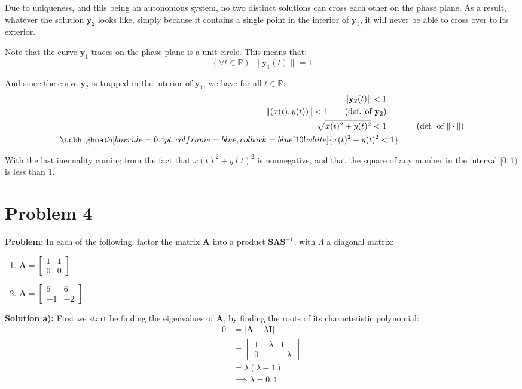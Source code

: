 \documentclass{article}
\begin{document}
Due to uniqueness, and this being an autonomous system, no two distinct solutions can cross each other on the phase plane. As a result, whatever the solution $\mathbf{y}_2$ looks like, simply because it contains a single point in the interior of $\mathbf{y}_1$, it will never be able to cross over to its exterior.

Note that the curve $\mathbf{y}_1$ traces on the phase plane is a unit circle. This means that:
\begin{equation*}
    (\forall t\in\mathbb R)\,\,\|\mathbf{y}_1(t)\|=1
\end{equation*} 

And since the curve $\mathbf{y}_2$ is trapped in the interior of $\mathbf{y}_1$, we have for all $t\in\mathbb R$:
\begin{align*}
    \|\mathbf{y}_2(t)\|<1\phantom{aaa}&\\
    \|(x(t),y(t))\|<1\tag{def. of $\mathbf{y}_2$}\phantom{aaa}&\\
    \sqrt{x(t)^2+y(t)^2}<1\phantom{aaa}&\tag{def. of $\|\cdot\|$}\\
    \tcbhighmath[boxrule=0.4pt,colframe=blue,colback=blue!10!white]{x(t)^2+y(t)^2<1}\phantom{\,}&
\end{align*}

With the last inequality coming from the fact that $x(t)^2+y(t)^2$ is nonnegative, and that the square of any number in the interval $[0,1)$ is less than 1.
    
\section*{Problem 4}
\noindent\textbf{Problem:}  In each of the following, factor the matrix $\mathbf{A}$ into a product $\mathbf{S\Lambda S^{-1}}$, with $\Lambda$ a diagonal matrix:
\begin{enumerate}[label=\textbf{\alph*)}]
    \item $\mathbf{A}=\begin{bmatrix}1&1\\0&0\end{bmatrix}$
    \item $\mathbf{A}=\begin{bmatrix}5&6\\-1&-2\end{bmatrix}$
\end{enumerate}

\bigskip

\noindent\textbf{Solution a):} First we start be finding the eigenvalues of $\mathbf{A}$, by finding the roots of its characteristic polynomial:
\begin{align*}
    0&=|\mathbf{A}-\lambda \mathbf{I}|\\
    &=\begin{vmatrix} 1-\lambda & 1 \\ 0 & -\lambda \end{vmatrix}\\
    &=\lambda(\lambda-1)\\
    &\implies \lambda=0,1
\end{align*}
\end{document}
